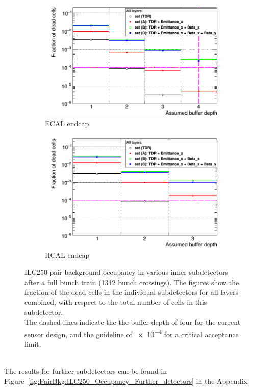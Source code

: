 \begin{figure}
\begin{subfigure}[b]{0.49\textwidth}
    \includegraphics[width=\textwidth]{Figures/Pairs/Appendix/Occupancy_Comparison_All_layers_deadcells_ILC250_ALL_SETS_ECALEndcap.png}
   \caption{\sid ECAL endcap}
   \end{subfigure}
   \hfill
    \begin{subfigure}[b]{0.49\textwidth}
   \centering
    \includegraphics[width=\textwidth]{Figures/Pairs/Appendix/Occupancy_Comparison_All_layers_deadcells_ILC250_ALL_SETS_HCALEndcap.png}
   \caption{\sid HCAL endcap}
   \end{subfigure}
   \caption[Pair background occupancy in various inner \sid subdetectors for the ILC250]{ILC250 pair background occupancy in various inner \sid subdetectors after a full bunch train (1312 bunch crossings).
   The figures show the fraction of the dead cells in the individual subdetectors for all layers combined, with respect to the total number of cells in this subdetector.
   \\The dashed lines indicate the the buffer depth of four for the current sensor design, and the guideline of \num{e-4} for a critical acceptance limit.
   }
   \label{fig:PairBkg:ILC250_Occupancy_Inner_detectors}
\end{figure}
\\The results for further subdetectors can be found in Figure~\ref{fig:PairBkg:ILC250_Occupancy_Further_detectors} in the Appendix.

